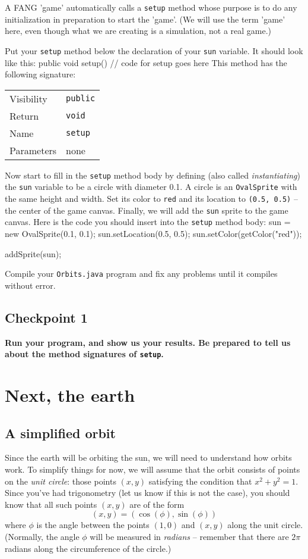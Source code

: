 \documentclass[11pt]{article}
\newenvironment{qv}%
  {\quote
   \verbatim}%
  {\endverbatim
   \endquote}
\begin{document}
A FANG 'game' automatically calls a \verb'setup' method
whose purpose is to do any initialization
in preparation to start the 'game'.
(We will use the term 'game' here,
even though what we are creating is a simulation,
not a real game.)

Put your \verb'setup' method
below the declaration of your \verb'sun' variable.
It should look like this:
\begin{qv}
public void setup() {
  // code for setup goes here
}
\end{qv}
This method has the following signature:

\begin{tabular}{l@{: }l}
Visibility & \verb'public' \\
Return     & \verb'void' \\
Name       & \verb'setup' \\
Parameters & none \\
\end{tabular}

Now start to fill in the {\tt setup} method body
by defining (also called {\em instantiating}) the {\tt sun} variable
to be a circle with diameter 0.1.
A circle is an \verb'OvalSprite' with the same
height and width.
Set its color to {\tt red} and its location to {\tt (0.5, 0.5)} --
the center of the game canvas.
Finally, we will add the {\tt sun} sprite to the game canvas.
Here is the code you should insert into the \verb'setup' method body:
\begin{qv}
sun = new OvalSprite(0.1, 0.1);
sun.setLocation(0.5, 0.5);
sun.setColor(getColor("red"));

addSprite(sun);
\end{qv}

Compile your {\tt Orbits.java} program
and fix any problems until it compiles without error.
\subsection*{Checkpoint 1}
{\bf
Run your program, and show us your results.
Be prepared to tell us about the method signatures of \verb'setup'.
}

\section*{Next, the earth}

\subsection*{A simplified orbit}
Since the earth will be orbiting the sun,
we will need to understand how orbits work.
To simplify things for now, we will assume that the orbit
consists of points on the {\em unit circle}:
those points $(x,y)$ satisfying the condition that $x^2 + y^2 = 1$.
Since you've had trigonometry (let us know if this is not the case),
you should know that all such points $(x,y)$ are of the form
\[(x,y) = (\cos(\phi), \sin(\phi))\]
where $\phi$ is the angle between the points $(1,0)$ and $(x,y)$
along the unit circle.
(Normally, the angle $\phi$ will be measured in {\em radians} --
remember that there are $2\pi$ radians
along the circumference of the circle.)
\end{document}
